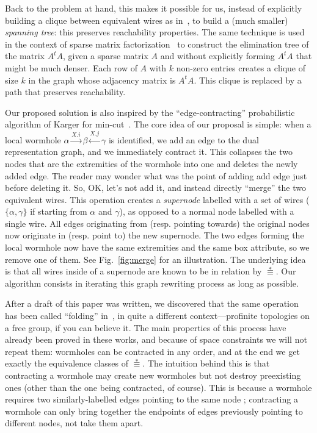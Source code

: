 \documentclass[a4paper,UKenglish,cleveref, autoref]{lipics-v2021}
\begin{document}
Back to the problem at hand, this makes it possible for us, instead of
explicitly building a clique between equivalent wires as
in~\cite{DBLP:conf/concur/BouajjaniEM97,DBLP:journals/entcs/FinkelWW97}, to
build a (much smaller) \emph{spanning tree}: this preserves reachability
properties. The same technique is used in the context of sparse matrix
factorization~\cite{osti_834431} to construct the elimination tree of the matrix
$A^t A$, given a sparse matrix $A$ and without explicitly forming $A^t A$ that
might be much denser. Each row of $A$ with $k$ non-zero entries creates a clique
of size $k$ in the graph whose adjacency matrix is $A^t A$. This clique is
replaced by a path that preserves reachability.

Our proposed solution is also inspired by the ``edge-contracting'' probabilistic
algorithm of Karger for min-cut~\cite{DBLP:conf/soda/Karger93}. The core idea of
our proposal is simple: when a local wormhole
$\alpha \xrightarrow{X.i} \beta \xleftarrow {X.j} \gamma$ is identified, we add
an edge  to the
dual representation graph, and we immediately contract it. This collapses the
two nodes that are the extremities of the wormhole into one and deletes the
newly added edge. The reader may wonder what was the point of adding add edge
just before deleting it. So, OK, let's not add it, and instead directly
``merge'' the two equivalent wires. This operation creates a \emph{supernode}
labelled with a set of wires ($\{\alpha, \gamma\}$ if starting from $\alpha$ and
$\gamma$), as opposed to a normal node labelled with a single wire. All edges
originating from (resp. pointing towards) the original nodes now originate in
(resp. point to) the new supernode. The two edges forming the local wormhole now
have the same extremities and the same box attribute, so we remove one of
them. See Fig.~\ref{fig:merge} for an illustration. The underlying idea is that
all wires inside of a supernode are known to be in relation by
$\stackrel{*}{\equiv}$. Our algorithm consists in iterating this graph rewriting
process as long as possible.

After a draft of this paper was written, we discovered that the same operation
has been called ``folding''
in~\cite{Stallings1983,b97de931-5994-30c4-b01e-c43e12a3f8e6,STEINBERG2002341},
in quite a different context---profinite topologies on a free group, if you can
believe it. The main properties of this process have already been proved in
these works, and because of space constraints we will not repeat them: wormholes
can be contracted in any order, and at the end we get exactly the equivalence
classes of $\stackrel{*}{\equiv}$. The intuition behind this is that contracting
a wormhole may create new wormholes but not destroy preexisting ones (other than
the one being contracted, of course). This is because a wormhole requires two
similarly-labelled edges pointing to the same node ; contracting a wormhole can
only bring together the endpoints of edges previously pointing to different
nodes, not take them apart.
\end{document}
